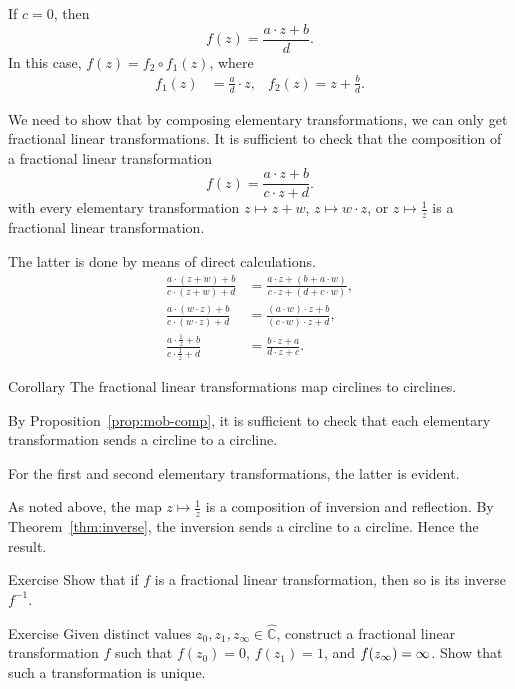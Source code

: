 If $c=0$, then
\[f(z) = \frac{a\cdot z + b}{ d}.\]
In this case, $f(z)=f_2\circ f_1 (z)$,
where 
\begin{align*}
f_1(z)&= \tfrac ad\cdot z,
&
f_2(z)= z+\tfrac bd.
\end{align*}

We need to show that by composing elementary transformations,
we can only get fractional linear transformations.
It is sufficient to check that the composition of a fractional linear transformation
$$f(z) = \frac{a\cdot z + b}{c\cdot z + d}.$$
with every elementary transformation $z\mapsto z+w$, $z\mapsto w\cdot z$, or $z\mapsto \tfrac1z$ is a fractional linear transformation.

The latter is done by means of direct calculations.
\begin{align*}
\frac{a\cdot (z+w) + b}{c\cdot (z+w) + d}
&=
\frac{a\cdot z + (b+a\cdot w)}{c\cdot z + (d+c\cdot w)},
\\
\frac{a\cdot (w\cdot z) + b}{c\cdot (w\cdot z) + d}
&=
\frac{(a\cdot w)\cdot z + b}{(c\cdot w)\cdot z + d},
\\
\frac{a\cdot \frac1z + b}{c\cdot \frac1z + d}
&=
\frac{b\cdot z + a}{d\cdot z + c}.
\end{align*}
\qedsf


\begin{thm}{Corollary}\label{cor:cline-Moeb}
The fractional linear transformations map circlines to circlines.
\end{thm}

By Proposition~\ref{prop:mob-comp},
it is sufficient to check that each elementary transformation sends a circline to a circline.

For the first and second elementary transformations, the latter is evident.

As noted above,
the map $z\mapsto\tfrac1z$ is a composition of inversion and reflection.
By Theorem~\ref{thm:inverse}, the inversion sends a circline to a circline.
Hence the result.
\qeds

\begin{thm}{Exercise}\label{ex:inverse-Mob}
Show that if $f$ is a fractional linear transformation, then so is its inverse $f^{-1}$.
\end{thm}


\begin{thm}{Exercise}\label{ex:3-point-Mob}
Given distinct values $z_0,z_1,z_\infty\in \hat{\mathbb{C}}$,
construct a fractional linear transformation $f$ such that 
$f(z_0)=0$,
$f(z_1)=1$,
and 
$f(z_\infty)=\infty$.
Show that such a transformation is unique.
\end{thm}

